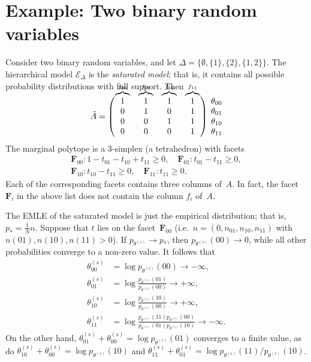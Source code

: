\documentclass[aos,noinfoline]{imsart}
\newcommand{\Ecal}{\mathcal{E}}
\newcommand{\Fbf}{\mathbf{F}}
\newcommand{\gmle}{p_{*}}
\theoremstyle{remark}
\theoremstyle{definition}
\newcommand\overmat[2]{\smash{%
  \overbrace{#2\strut}^{\text{\color{black}#1}}}}
\begin{document}
\section{Example: Two binary random variables}
\label{S-sec:two-binaries}

Consider two binary random variables, and let $\Delta=\{\emptyset, \{1\}, \{2\}, \{1,2\}\}$.  The hierarchical model
$\Ecal_{\Delta}$ is the \emph{saturated model}; that is, it contains all possible probability distributions with full
support.  Then\nopagebreak
\vspace{4mm}
\begin{equation*}
    \tilde A = \begin{pmatrix}
      \overmat{$f_{00}$}{1} & \overmat{$f_{01}$}{1} & \overmat{$f_{10}$}{1} & \overmat{$f_{11}$}{1} \\
      0 & 1 & 0 & 1 \\
      0 & 0 & 1 & 1 \\
      0 & 0 & 0 & 1
    \end{pmatrix}
    \;
    \begin{matrix}
      \theta_{00} \\ \theta_{01} \\ \theta_{10} \\ \theta_{11}
    \end{matrix}
  \end{equation*}
  The marginal polytope is a 3-simplex (a tetrahedron) with facets
  \begin{gather*}
    \Fbf_{00}: 1 - t_{01} - t_{10} + t_{11} \ge 0, \quad
    \Fbf_{01}: t_{01} - t_{11} \ge 0, \\
    \Fbf_{10}: t_{10} - t_{11} \ge 0, \quad
    \Fbf_{11}: t_{11} \ge 0.
  \end{gather*}
  Each of the corresponding facets contains three columns of~$A$.  In fact, the facet $\Fbf_{i}$ in the above
  list does not contain the column $f_{i}$ of~$A$.

  The EMLE of the saturated model is just the empirical distribution; that is, $\gmle=\frac{1}{N}n$.  Suppose that $t$
  lies on the facet~$\Fbf_{00}$ (i.e.~$n=(0,n_{01},n_{10},n_{11})$ with $n(01), n(10), n(11)>0$).  If
  $p_{\theta^{(s)}}\to\gmle$, then $p_{\theta^{(s)}}(00)\to 0$, while all other probabilities converge to a non-zero
  value.  It follows that
  \begin{align*}
    \theta^{(s)}_{00}& =\log p_{\theta^{(s)}}(00)\to-\infty, \\
    \theta^{(s)}_{01}& =\log \frac{p_{\theta^{(s)}}(01)}{p_{\theta^{(s)}}(00)} \to +\infty, \\
    \theta^{(s)}_{10}& =\log \frac{p_{\theta^{(s)}}(10)}{p_{\theta^{(s)}}(00)} \to +\infty, \\
    \theta^{(s)}_{11}& =\log \frac{p_{\theta^{(s)}}(11)p_{\theta^{(s)}}(00)}{p_{\theta^{(s)}}(01)p_{\theta^{(s)}}(10)} \to -\infty.
  \end{align*}
  On the other hand, $\theta^{(s)}_{01}+\theta^{(s)}_{00}=\log p_{\theta^{(s)}}(01)$ converges to a finite value, as do
  $\theta^{(s)}_{10}+\theta^{(s)}_{00}=\log p_{\theta^{(s)}}(10)$ and $\theta^{(s)}_{11}+\theta^{(s)}_{01}=\log
  p_{\theta^{(s)}}(11)/p_{\theta^{(s)}}(10)$.
\end{document}

